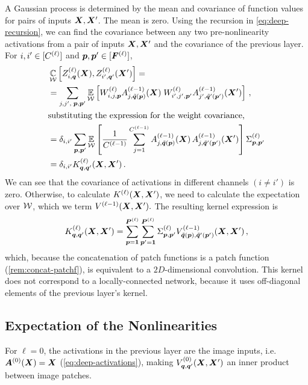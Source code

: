 \documentclass[accepted]{uai2021} %
\newcommand{\layerAsd}[2]{Z^{(#1)}_{#2}(\vX')}
\newcommand{\layerAs}[2]{Z^{(#1)}_{#2}(\vX)}
\newcommand{\layerC}[1]{C^{(#1)}}
\newcommand{\layerNLAsd}[2]{A^{(#1)}_{#2}(\vX')}
\newcommand{\layerNLAs}[2]{A^{(#1)}_{#2}(\vX)}
\newcommand{\layerNLA}[2]{\vA^{(#1)}_{#2}(\vX)}
\newcommand{\layerWs}[1]{W^{(#1)}}
\newcommand{\layersizebase}{\vF}
\newcommand{\layersize}[1]{{\layersizebase^{\bra{#1}}}}
\newcommand{\patchsizebase}{\vP}
\newcommand{\patchsize}[1]{{\patchsizebase^{\bra{#1}}}}
\newcommand{\patchf}[2]{{\tilde#1\bra{#2}}}
\newcommand{\priorWcovs}[1]{\Sigma^{(#1)}}
\newcommand{\chan}{i}
\newcommand{\prevchan}{j}   %
\newcommand{\patch}{\vp}               %
\newcommand{\nextpatch}{\vq}
\newcommand{\covf}[1]{K\ssup{#1}}
\newcommand{\nlinf}[1]{V\ssup{#1}}
\newcommand{\0}{\boldsymbol{0}}
\newcommand{\1}{\boldsymbol{1}}
\newcommand{\crefp}[1]{(\cref{#1})}
\begin{document}
A Gaussian process is determined by the mean and covariance of function values for pairs of inputs ${\bm{X}},{\bm{X}}'$. The mean is zero. Using the recursion in \cref{eq:deep-recursion}, we can find the covariance between any two pre-nonlinearity activations from a pair of inputs ${\bm{X}},{\bm{X}}'$ and the covariance of the previous layer. For $\chan,\chan'\in\countto{\layerC{\ell}}$ and $\patch,\patch'\in\countto{\layersize{\ell}}$,
\begin{align}
  &\Cov_{\gW}\left[\layerAs{\ell}{\chan,\nextpatch},\layerAsd{\ell}{\chan',\nextpatch'}\right] = \nonumber\\
  &=\sum_{\prevchan,\prevchan',\;\patch,\patch'} \Expect{\gW}{
    \layerWs{\ell}_{\chan,\prevchan,\patch}\layerNLAs{\ell-1}{\prevchan,\patchf{\nextpatch}{\patch}}\; \layerWs{\ell}_{\chan',\prevchan',\patch'}\layerNLAsd{\ell-1}{\prevchan',\patchf{\nextpatch'}{\patch'}}}\,, \nonumber \\
  \intertext{substituting the expression for the weight covariance,}
  &= \delta_{\chan,\chan'} \sum_{\patch,\patch'}
    \Expect{\gW}{\frac{1}{\layerC{\ell-1}}\sum_{\prevchan=1}^{\layerC{\ell-1}}
    \layerNLAs{\ell-1}{\prevchan,\patchf{\nextpatch}{\patch}}\,
    \layerNLAsd{\ell-1}{\prevchan,\patchf{\nextpatch'}{\patch'}}
    } \priorWcovs{\ell}_{\patch,\patch'} \nonumber \\
  &= \delta_{\chan,\chan'} \covf{\ell}_{\nextpatch,\nextpatch'}\bra{\mX,\mX'}\,.\label{eq:kernel-recursion}
\end{align}
We can see that the covariance of activations in different channels
$(\chan\ne\chan')$ is zero. Otherwise, to calculate
$\covf{\ell}\bra{\mX,\mX'}$, we need to calculate the
expectation over ${\mathcal{W}}$, which we term $\nlinf{\ell-1}\bra{\mX,\mX'}.$ The resulting kernel expression is
\begin{equation}
  \covf{\ell}_{\nextpatch,\nextpatch'}\bra{\mX,\mX'} = \sum_{\patch=\1}^{{\patchsize{\ell}}}
  \sum_{\patch'=\1}^{{\patchsize{\ell}}} \priorWcovs{\ell}_{\patch,\patch'}
  \nlinf{\ell-1}_{\patchf{\nextpatch}{\patch},\patchf{\nextpatch'}{\patch'}}\bra{\mX,\mX'}\,,
  \label{eq:cnn-kernel-recursive}
\end{equation}
which, because the concatenation of patch functions is a patch function \crefp{rem:concat-patchf}, is equivalent to a $2D$-dimensional convolution. This kernel does not correspond to a locally-connected network, because it uses off-diagonal elements of the previous layer's kernel.

\subsection{Expectation of the Nonlinearities}
\label{sec:exp-nonlin}
For $\ell=0$, the activations in the previous layer are the image inputs, i.e.~$\layerNLA{0}{} = \vX$ (\cref{eq:deep-activations}), making $\nlinf{0}_{\nextpatch,\nextpatch'}\bra{\mX,\mX'}$ an inner product between image patches.
\end{document}
